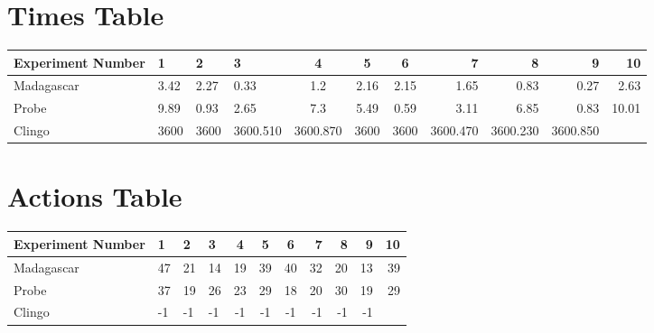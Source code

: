 \documentclass[8pt]{article}
\begin{document}
\begin{landscape}
\section{Times Table}\begin{tabular}{ | l | l | l | l | c | c | c | r | r | r | r | }\hline
Experiment Number & 1 & 2 & 3 & 4 & 5 & 6 & 7 & 8 & 9 & 10\\  \hline
Madagascar & 3.42 & 2.27 & 0.33 & 1.2 & 2.16 & 2.15 & 1.65 & 0.83 & 0.27 & 2.63\\  \hline
Probe & 9.89 & 0.93 & 2.65 & 7.3 & 5.49 & 0.59 & 3.11 & 6.85 & 0.83 & 10.01\\  \hline
Clingo & 3600 & 3600 & 3600.510 & 3600.870 & 3600 & 3600 & 3600.470 & 3600.230 & 3600.850\\  \hline
\end{tabular}
\section{Actions Table}\begin{tabular}{ | l | l | l | l | c | c | c | r | r | r | r | }\hline
Experiment Number & 1 & 2 & 3 & 4 & 5 & 6 & 7 & 8 & 9 & 10\\ \hline
 Madagascar & 47 & 21 & 14 & 19 & 39 & 40 & 32 & 20 & 13 & 39\\ \hline
 Probe & 37 & 19 & 26 & 23 & 29 & 18 & 20 & 30 & 19 & 29\\ \hline
 Clingo & -1 & -1 & -1 & -1 & -1 & -1 & -1 & -1 & -1\\ \hline
\end{tabular}
\end{landscape}
\end{document}
